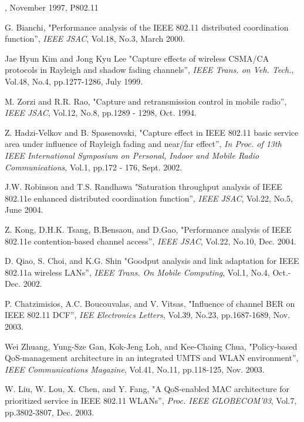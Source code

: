 \documentclass[10pt,onecolumn,a4paper]{IEEEtran}
\begin{document}
\begin{thebibliography}{99}

, November 1997, P802.11

 G. Bianchi, "Performance analysis of the IEEE 802.11 distributed
coordination function'', {\em IEEE JSAC}, Vol.18, No.3, March
2000.

 Jae Hyun Kim and Jong Kyu Lee
"Capture effects of wireless CSMA/CA protocols in Rayleigh and
shadow fading channels'', {\em IEEE Trans. on Veh. Tech.}, Vol.48,
No.4, pp.1277-1286, July 1999.

M. Zorzi and R.R. Rao, "Capture and retransmission control in
mobile radio'', {\em IEEE JSAC}, Vol.12, No.8, pp.1289 - 1298,
Oct. 1994.

Z. Hadzi-Velkov and B. Spasenovski, "Capture effect in IEEE 802.11
basic service area under influence of Rayleigh fading and near/far
effect'', {\em In Proc. of 13th IEEE International Symposium on
Personal, Indoor and Mobile Radio Communications}, Vol.1, pp.172 -
176, Sept. 2002.

 J.W. Robinson and T.S. Randhawa "Saturation throughput analysis of IEEE 802.11e
enhanced distributed coordination function'', {\em IEEE JSAC},
Vol.22, No.5, June 2004.

 Z. Kong, D.H.K. Tsang, B.Bensaou,
and D.Gao, "Performance analysis of IEEE 802.11e contention-based
channel access'', {\em IEEE JSAC}, Vol.22, No.10, Dec. 2004.

 D. Qiao, S. Choi, and K.G. Shin "Goodput analysis and link adaptation for IEEE
802.11a wireless LANs'', {\em IEEE Trans. On Mobile Computing},
Vol.1, No.4, Oct.-Dec. 2002.

P. Chatzimisios, A.C. Boucouvalas, and V. Vitsas, "Influence of
channel BER on IEEE 802.11 DCF'', {\em IEE Electronics Letters},
Vol.39, No.23, pp.1687-1689, Nov. 2003.

Wei Zhuang, Yung-Sze Gan, Kok-Jeng Loh, and Kee-Chaing Chua,
"Policy-based QoS-management architecture in an integrated UMTS
and WLAN environment'', {\em IEEE Communications Magazine},
Vol.41, No.11, pp.118-125, Nov. 2003.

W. Liu, W. Lou, X. Chen, and Y. Fang, "A QoS-enabled MAC
architecture for prioritized service in IEEE 802.11 WLANs'', {\em
Proc. IEEE GLOBECOM'03}, Vol.7, pp.3802-3807, Dec. 2003.


\end{thebibliography}
\end{document}
